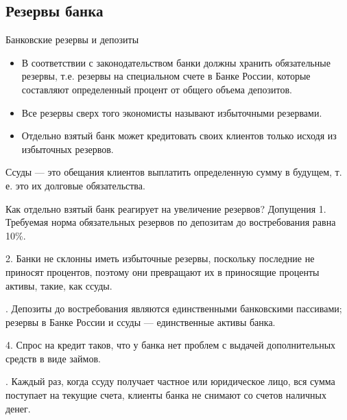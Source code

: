 \documentclass[_DKB_p1_Money.tex]{subfiles}
\begin{document}

\subsection{Резервы банка}
\begin{frame}[shrink=5]{Банковские резервы и депозиты}
\begin{itemize}[<+->]
\item
В соответствии с законодательством банки должны хранить обязательные резервы, т.е. резервы на специальном счете в Банке России, которые составляют определенный процент от общего объема депозитов. 

\item
Все резервы сверх того экономисты называют избыточными резервами.

\item
Отдельно взятый банк может кредитовать своих клиентов только исходя из избыточных резервов.
\end{itemize}
\begin{block}{Ссуды }
\quad
— это обещания клиентов выплатить определенную сумму в будущем, т. е. это их долговые обязательства.
\end{block}
\end{frame}

\begin{frame}[allowframebreaks]{\setfontsize{12pt}Как отдельно взятый банк реагирует на увеличение резервов?}
{Допущения}
1. Требуемая норма обязательных резервов по депозитам до востребования равна 10\%.

2. Банки не склонны иметь избыточные резервы, поскольку последние не приносят процентов, поэтому они превращают их в приносящие проценты активы, такие, как ссуды. 

. Депозиты до востребования являются единственными банковскими пассивами; резервы в Банке России и ссуды — единственные активы банка. 

4. Спрос на кредит таков, что у банка нет проблем с выдачей дополнительных средств в виде займов. 

. Каждый раз, когда ссуду получает частное или юридическое лицо, вся сумма поступает на текущие счета, клиенты банка не снимают со счетов наличных денег.
\end{frame}
\end{document}
